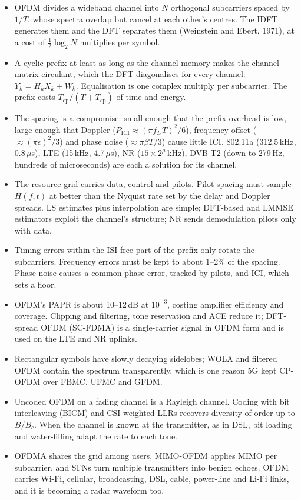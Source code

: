 \begin{itemize}
\item OFDM divides a wideband channel into $N$ orthogonal subcarriers spaced by $1/T$, whose spectra overlap but
cancel at each other's centres. The IDFT generates them and the DFT separates them (Weinstein and Ebert, 1971), at
a cost of $\tfrac12\log_2N$ multiplies per symbol.
\item A cyclic prefix at least as long as the channel memory makes the channel matrix circulant, which the DFT
diagonalises for every channel: $Y_k=H_kX_k+W_k$. Equalisation is one complex multiply per subcarrier. The prefix
costs $T_{\text{cp}}/(T+T_{\text{cp}})$ of time and energy.
\item The spacing is a compromise: small enough that the prefix overhead is low, large enough that Doppler
($P_{\text{ICI}}\approx(\pi f_DT)^2/6$), frequency offset ($\approx(\pi\epsilon)^2/3$) and phase noise
($\approx\pi\beta T/3$) cause little ICI. 802.11a (312.5\,kHz, 0.8\,$\mu$s), LTE (15\,kHz, 4.7\,$\mu$s), NR ($15\times2^\mu$\,kHz),
DVB-T2 (down to 279\,Hz, hundreds of microseconds) are each a solution for its channel.
\item The resource grid carries data, control and pilots. Pilot spacing must sample $H(f,t)$ at better than the
Nyquist rate set by the delay and Doppler spreads. LS estimates plus interpolation are simple; DFT-based and
LMMSE estimators exploit the channel's structure; NR sends demodulation pilots only with data.
\item Timing errors within the ISI-free part of the prefix only rotate the subcarriers. Frequency errors must be
kept to about 1--2\% of the spacing. Phase noise causes a common phase error, tracked by pilots, and ICI, which
sets a floor.
\item OFDM's PAPR is about 10--12\,dB at $10^{-3}$, costing amplifier efficiency and coverage. Clipping and filtering,
tone reservation and ACE reduce it; DFT-spread OFDM (SC-FDMA) is a single-carrier signal in OFDM form and is used
on the LTE and NR uplinks.
\item Rectangular symbols have slowly decaying sidelobes; WOLA and filtered OFDM contain the spectrum
transparently, which is one reason 5G kept CP-OFDM over FBMC, UFMC and GFDM.
\item Uncoded OFDM on a fading channel is a Rayleigh channel. Coding with bit interleaving (BICM) and CSI-weighted
LLRs recovers diversity of order up to $B/B_c$. When the channel is known at the transmitter, as in DSL, bit
loading and water-filling adapt the rate to each tone.
\item OFDMA shares the grid among users, MIMO-OFDM applies MIMO per subcarrier, and SFNs turn multiple transmitters
into benign echoes. OFDM carries Wi-Fi, cellular, broadcasting, DSL, cable, power-line and Li-Fi links, and it is
becoming a radar waveform too.
\end{itemize}

